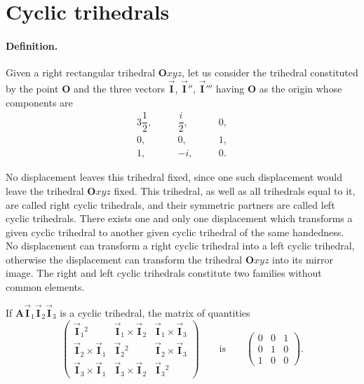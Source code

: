 \documentclass[leqno,11pt]{book}
\numberwithin{equation}{chapter}
\theoremstyle{shape1}
\theoremstyle{shapesmall}
\newcommand{\rvec}[1]{\vec{\mathbf{#1}}}
\newcommand{\ivec}{\rvec{I}}
\begin{document}
\section{Cyclic trihedrals}
\label{sec:cyclic-trihedrals}

\paragraph{Definition.}
\label{sec:23}
Given a right rectangular trihedral $\mathbf{O}xyz$, let us consider the trihedral constituted by the point $\mathbf{O}$ and the three vectors $\ivec$, $\ivec''$, $\ivec'''$ having $\mathbf{O}$ as the origin whose components are
\begin{alignat*}{3}  
  \dfrac{1}{2},\quad&&\dfrac{i}{2},\quad&&0,\\
  0,\quad&&0,\quad&&1,\\
  1,\quad&&-i,\quad&&0.
\end{alignat*}

No displacement leaves this trihedral fixed, since one such displacement would leave the trihedral $\mathbf{O}xyz$ fixed. This trihedral, as well as all trihedrals equal to it, are called right cyclic trihedrals, and their symmetric partners are called left cyclic trihedrals. There exists one and only one displacement which transforms a given cyclic trihedral to another given cyclic trihedral of the same handedness. No displacement can transform a right cyclic trihedral into a left cyclic trihedral, otherwise the displacement can transform the trihedral $\mathbf{O}xyz$ into its mirror image. The right and left cyclic trihedrals constitute two families without common elements.

If $\mathbf{A}\ivec_{1}\ivec_{2}\ivec_{3}$ is a cyclic trihedral, the matrix of quantities
\begin{equation}
  \label{eq:2.3}
  \begin{pmatrix}
    \ivec_{1}{}^{2}&\ivec_{1}\times\ivec_{2}&\ivec_{1}\times\ivec_{3}\\
    \ivec_{2}\times\ivec_{1}&\ivec_{2}{}^{2}&\ivec_{2}\times\ivec_{3}\\
    \ivec_{3}\times\ivec_{1}&\ivec_{3}\times\ivec_{2}&\ivec_{3}{}^{2}
  \end{pmatrix}\qquad\text{is}\qquad
  \begin{pmatrix}
    0&0&1\\
    0&1&0\\
    1&0&0
  \end{pmatrix}.
\end{equation}
\end{document}
